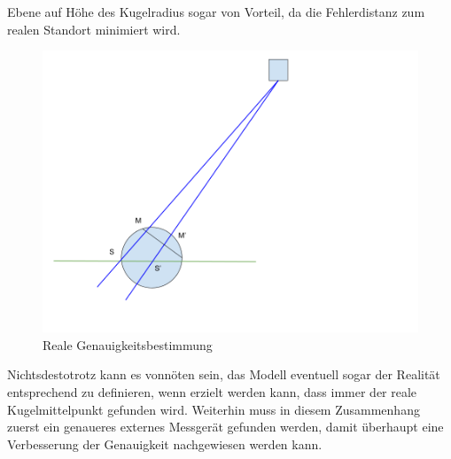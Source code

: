 Ebene auf Höhe des Kugelradius sogar von Vorteil, da die Fehlerdistanz zum realen Standort minimiert wird.
\begin{figure}[h!]
    \includegraphics[width=0.4\linewidth]{../common/05_further_work/resources/01_genauigkeit_real.png}
    \caption{Reale Genauigkeitsbestimmung}
    \label{fig:genauigkeit:real}
\end{figure}


Nichtsdestotrotz kann es vonnöten sein, das Modell eventuell sogar der Realität entsprechend zu definieren, wenn erzielt
werden kann, dass immer der reale Kugelmittelpunkt gefunden wird. Weiterhin muss in diesem Zusammenhang zuerst ein genaueres
externes Messgerät gefunden werden, damit überhaupt eine Verbesserung der Genauigkeit nachgewiesen werden kann.

